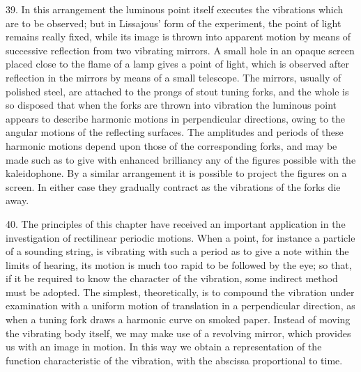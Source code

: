 39. In this arrangement the luminous point itself executes the vibrations which
are to be observed; but in Lissajous' form of the experiment, the point of
light remains really fixed, while its image is thrown into apparent motion by
means of successive reflection from two vibrating mirrors. A small hole in an
opaque screen placed close to the flame of a lamp gives a point of light, which
is observed after reflection in the mirrors by means of a small telescope. The
mirrors, usually of polished steel, are attached to the prongs of stout tuning
forks, and the whole is so disposed that when the forks are thrown into
vibration the luminous point appears to describe harmonic motions in
perpendicular directions, owing to the angular motions of the reflecting
surfaces. The amplitudes and periods of these harmonic motions depend upon
those of the corresponding forks, and may be made such as to give with enhanced
brilliancy any of the figures possible with the kaleidophone. By a similar
arrangement it is possible to project the figures on a screen. In either case
they gradually contract as the vibrations of the forks die away.

40. The principles of this chapter have received an important application in
the investigation of rectilinear periodic motions. When a point, for instance a
particle of a sounding string, is vibrating with such a period as to give a
note within the limits of hearing, its motion is much too rapid to be followed
by the eye; so that, if it be required to know the character of the vibration,
some indirect method must be adopted. The simplest, theoretically, is to
compound the vibration under examination with a uniform motion of translation
in a perpendicular direction, as when a tuning fork draws a harmonic curve on
smoked paper.  Instead of moving the vibrating body itself, we may make use of
a revolving mirror, which provides us with an image in motion. In this way we
obtain a representation of the function characteristic of the vibration, with
the abscissa proportional to time.

